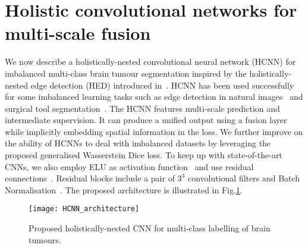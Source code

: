\documentclass[runningheads,orivec,a4paper]{llncs}
\begin{document}
\section{Holistic convolutional networks for multi-scale fusion}
We now describe a holistically-nested convolutional neural network
(HCNN) for imbalanced multi-class brain tumour segmentation inspired by
the holistically-nested edge detection (HED) introduced
in~\cite{hed}. HCNN has been used successfully for some imbalanced
learning tasks such as edge detection in natural images~\cite{hed} and
surgical tool segmentation~\cite{toolnet}.
The HCNN features multi-scale prediction and intermediate
supervision. It can produce a unified output using a fusion layer
while implicitly embedding spatial information in the loss. 
%
We further improve on the ability of HCNNs to deal with imbalanced
datasets by leveraging the proposed generalised Wasserstein Dice loss. 
%
To keep up with state-of-the-art CNNs, we also employ ELU as
activation function~\cite{elu} and use residual
connections~\cite{resnet}. Residual blocks include a pair of $3^3$
convolutional filters and Batch Normalisation~\cite{wideresnet}. The
proposed architecture is illustrated in
Fig.\ref{fig:hcnn_architecture}. 



\begin{figure}[b!]
	\centering
	\texttt{[image: HCNN\_architecture]}
	\caption{Proposed holistically-nested CNN for multi-class labelling of brain tumours.}
	\label{fig:hcnn_architecture}
\end{figure}
\end{document}
